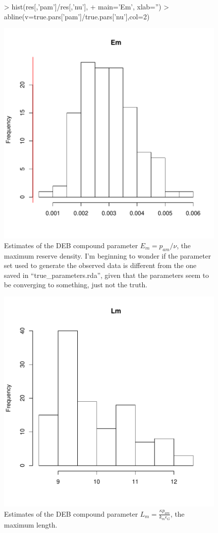 \documentclass[12pt,reqno,final]{amsart}
\theoremstyle{plain}
\numberwithin{equation}{part}
\begin{document}
\begin{figure}
\begin{Schunk}
\begin{Sinput}
> hist(res[,'pam']/res[,'nu'],
+      main='Em', xlab='')
> abline(v=true.pars['pam']/true.pars['nu'],col=2)
\end{Sinput}
\end{Schunk}
\includegraphics{Solving_the_problem_of_parameter_covariation_2-009}
\caption{Estimates of the DEB compound parameter $E_m = p_{am}/\nu$,
  the maximum reserve density. I'm beginning to wonder if the
  parameter set used to generate the observed data is different from
  the one saved in ``true\_parameters.rda'', given that the parameters
  seem to be converging to something, just not the truth.}
\end{figure}

\begin{figure}
\includegraphics{Solving_the_problem_of_parameter_covariation_2-010}
\caption{Estimates of the DEB compound parameter $L_m = \frac{\kappa
    p_{am}}{k_m \epsilon_G}$, the maximum length.}
\end{figure}
\end{document}
